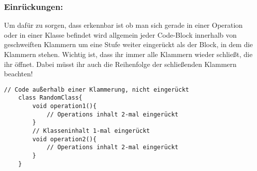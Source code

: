 \subsubsection*{Einrückungen:}
Um dafür zu sorgen, dass erkennbar ist ob man sich gerade in einer Operation oder in einer Klasse befindet wird allgemein jeder Code-Block innerhalb von geschweiften Klammern um eine Stufe weiter eingerückt als der Block, in dem die Klammern stehen.
Wichtig ist, dass ihr immer alle Klammern wieder schließt, die ihr öffnet.
Dabei müsst ihr auch die Reihenfolge der schließenden Klammern beachten!

\vspace{5mm}

\begin{lstlisting}[title=\textbf{Beispiel gute Namensgebung}]
	// Code außerhalb einer Klammerung, nicht eingerückt
	class RandomClass{
		void operation1(){
			// Operations inhalt 2-mal eingerückt
		}
		// Klasseninhalt 1-mal eingerückt
		void operation2(){
			// Operations inhalt 2-mal eingerückt
		}
	}
	
\end{lstlisting}

